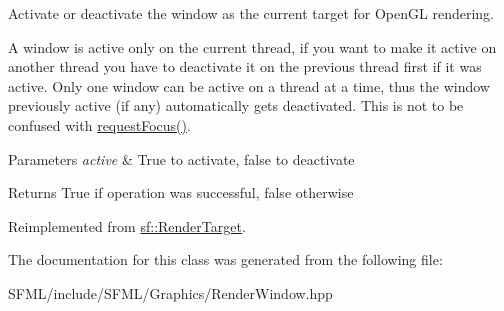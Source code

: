 Activate or deactivate the window as the current target for Open\+GL rendering. 

A window is active only on the current thread, if you want to make it active on another thread you have to deactivate it on the previous thread first if it was active. Only one window can be active on a thread at a time, thus the window previously active (if any) automatically gets deactivated. This is not to be confused with \mbox{\hyperlink{classsf_1_1_window_a58cf7fa1775e8e7542032e3ecfa83b49}{request\+Focus()}}.


\begin{DoxyParams}{Parameters}
{\em active} & True to activate, false to deactivate\\
\hline
\end{DoxyParams}
\begin{DoxyReturn}{Returns}
True if operation was successful, false otherwise \begin{DoxyVerb}\end{DoxyVerb}
 
\end{DoxyReturn}


Reimplemented from \mbox{\hyperlink{classsf_1_1_render_target_adc225ead22a70843ffa9b7eebefa0ce1}{sf\+::\+Render\+Target}}.



The documentation for this class was generated from the following file\+:\begin{DoxyCompactItemize}
\item 
S\+F\+M\+L/include/\+S\+F\+M\+L/\+Graphics/Render\+Window.\+hpp\end{DoxyCompactItemize}
